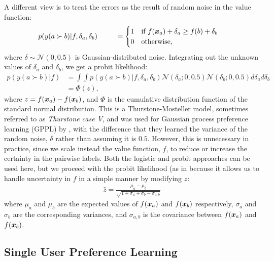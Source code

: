 A different view is to treat the errors as the result of random noise in the value function:
\begin{align}
 p(y(a \succ b) | f, \delta_{a}, \delta_{b} )  
 \hspace{0.9cm} & = \begin{cases}
 1 & \text{if }f(\boldsymbol x_a) + \delta_{a} \geq f(b) + \delta_{b} \\
 0 & \text{otherwise,}
 \end{cases} &
 \label{eq:thurstone}
\end{align}
where $\delta \sim \mathcal{N}(0, 0.5)$ is Gaussian-distributed noise.
Integrating out the unknown values of $\delta_a$ and $\delta_b$,
we get a probit likelihood:
\begin{align}
p( y(a \succ b) | f ) 
& = \int\int p( y(a \succ b) | f, \delta_{a}, \delta_{b} ) \mathcal{N}(\delta_{a}; 0, 0.5)\mathcal{N}(\delta_{b}; 0, 0.5) d\delta_{a} d\delta_{b} &\nonumber\\
& = \Phi\left( z \right), 
\label{eq:plphi}
\end{align}
where $z = f(\boldsymbol x_a) - f(\boldsymbol x_b)$,
and $\Phi$ is the cumulative distribution function of the standard normal distribution. 
This is a Thurstone-Mosteller model, sometimes referred to as \emph{Thurstone case V}, and was used for Gaussian process preference learning (GPPL) 
by \citet{chu2005preference}, with the difference that they learned the variance of the random noise, $\delta$
rather than assuming it is $0.5$. However, this is unnecessary in practice, since we 
scale instead the value function, $f$, to reduce or increase the certainty in the pairwise labels.
Both the logistic and probit approaches can be used here, but we proceed with
the probit likelihood (as in \citep{herbrich2007trueskill,chu2005preference}
because it allows us to handle uncertainty in $f$ in a simple manner %
by modifying $z$:
\begin{align}
\hat{z} = \frac{\mu_a - \mu_b}{\sqrt{1 + \sigma_a + \sigma_b - \sigma_{a,b}} }
\end{align}
where $\mu_a$ and $\mu_b$ are the expected values of $f(\boldsymbol x_a)$ and $f(\boldsymbol x_b)$ respectively, 
$\sigma_a$ and $\sigma_b$ are the corresponding variances,
and $\sigma_{a,b}$ is the covariance between $f(\boldsymbol x_a)$ and $f(\boldsymbol x_b)$.

\subsection{Single User Preference Learning}

